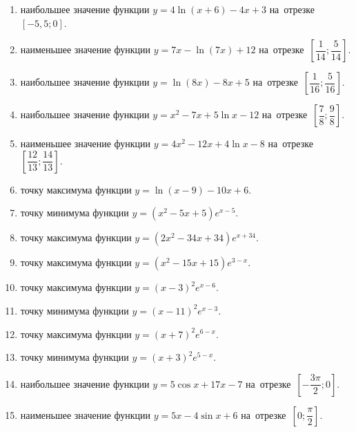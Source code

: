 \documentclass[a4paper,10pt]{article}
\begin{document}
\begin{enumerate}
\item {} наибольшее значение функции $y=4\ln \left(x+6\right)-4x+3$ на~отрезке~$\left[-5,5;0\right]$.

\item {} наименьшее значение функции $y=7x-\ln \left(7x\right)+12$ на~отрезке~$\left[\dfrac{1}{14};\dfrac{5}{14}\right]$.

\item {} наибольшее значение функции $y=\ln \left(8x\right)-8x+5$ на~отрезке~$\left[\dfrac{1}{16};\dfrac{5}{16}\right]$.

\item {} наибольшее значение функции $y=x^2-7x+5\ln x-12$ на~отрезке~$\left[\dfrac{7}{8};\dfrac{9}{8}\right]$.

\item {} наименьшее значение функции $y=4x^2-12x+4\ln x-8$ на~отрезке~$\left[\dfrac{12}{13};\dfrac{14}{13}\right]$.

\item {} точку максимума функции $y=\ln \left(x-9\right)-10x+6$.

\item {} точку минимума функции $y=\left(x^2-5x+5\right)e^{x-5}$.

\item {} точку максимума функции $y=\left(2x^2-34x+34\right)e^{x+34}$.

\item {} точку максимума функции $y=\left(x^2-15x+15\right)e^{3-x}$.

\item {} точку максимума функции $y=\left(x-3\right)^2e^{x-6}$.

\item {} точку минимума функции $y=\left(x-11\right)^2e^{x-3}$.

\item {} точку максимума функции $y=\left(x+7\right)^2e^{6-x}$.

\item {} точку минимума функции $y=\left(x+3\right)^2e^{5-x}$.

\item {} наибольшее значение функции $y=5\cos x+17x-7$ на~отрезке~$\left[-\dfrac{3\pi }{2};0\right]$.

\item {} наименьшее значение функции $y=5x-4\sin x+6$ на~отрезке~$\left[0;\dfrac{\pi }{2}\right]$.


\end{enumerate}
\end{document}

